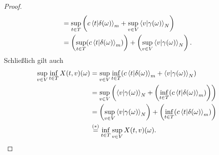 \begin{proof}
\begin{align*}
 &=\sup_{t\in T}\left(c\left\langle t |\delta(\omega)\right\rangle_m 
  + \sup_{v\in V}\left\langle v |\gamma(\omega)\right\rangle_N \right)\\
&=\left(\sup_{t \in T}(c\left\langle t |\delta(\omega)\right\rangle _m) \right)
  + \left(\sup_{v \in V}\left\langle v |\gamma(\omega)\right\rangle_N \right)\text.
\end{align*}
Schließlich gilt auch
\begin{align*}
\sup_{v \in V}\inf_{t\in T}X(t, v)(\omega) &=
\sup_{v \in V}\inf_{t \in T}(c\left\langle t |\delta(\omega)\right\rangle_m 
  + \left\langle v |\gamma(\omega)\right\rangle_N)\\
  &=\sup_{v \in V}\left(\left\langle v |\gamma(\omega)\right\rangle_N + 
  \left(\inf_{t \in T}(c\left\langle t |\delta(\omega)\right\rangle_m)\right) \right)\\
  &= \left(\sup_{v \in V}\left\langle v |\gamma(\omega)\right\rangle_N \right) + 
  \left(\inf_{t \in T}(c\left\langle t |\delta(\omega)\right\rangle_m)\right)\\
  &\overset{(\ast)}= \inf_{t \in T}\sup_{v \in V}X(t, v)(\omega)\text.
\end{align*}
\end{proof}